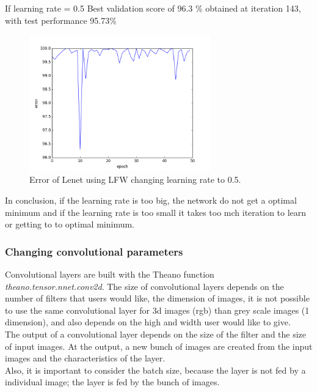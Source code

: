 If learning rate = 0.5 Best validation score of 96.3 \% obtained at iteration 143, with test performance 95.73\% \\

\begin{figure}[htb]
\centering
\includegraphics[width=0.7\textwidth]{images/LFW_learningrate/error_0_5.png}
\caption{Error of Lenet using LFW changing learning rate to 0.5.} \label{fig:LENETLFW_lr0_5}
\end{figure}

In conclusion, if the learning rate is too big, the network do not get a optimal minimum and if the learning rate is too small it takes too mch iteration to learn or getting to to optimal minimum.\\


\subsubsection{Changing convolutional parameters}
Convolutional layers are built with the Theano function \textit{theano.tensor.nnet.conv2d}. The size of convolutional layers depends on the number of filters that users would like, the dimension of images, it is not possible to use the same convolutional layer for 3d images (rgb) than grey scale images (1 dimension), and also depends on the high and width user would like to give.\\

The output of a convolutional layer depends on the size of the filter and the size of input images. At the output, a new bunch of images are created from the input images and the characteristics of the layer.\\

Also, it is important to consider the batch size, because the layer is not fed by a individual image; the layer is fed by the bunch of images.\\


